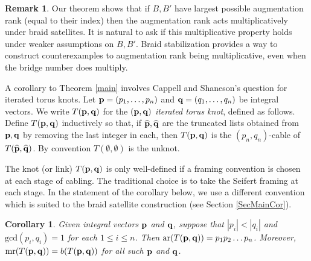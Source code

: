 \documentclass{amsart}[11pt,fullpage]
\def\s{{\sigma}}
\def\ar{\operatorname{ar}}
\def\mr{\operatorname{mr}}
\newcommand\Sp{\Sigma^{(p)}}
\newtheorem{cor}[thm]{Corollary}
\theoremstyle{definition}
\newtheorem{rem}[thm]{Remark}
\begin{document}
\begin{rem}Our theorem shows that if $B, B'$ have largest possible augmentation rank (equal to their index) then the augmentation rank acts multiplicatively under braid satellites. It is natural to ask if this multiplicative property holds under weaker assumptions on $B, B'$. Braid stabilization provides a way to construct counterexamples to augmentation rank being multiplicative, even when the bridge number does multiply.
\label{rem:BrSatNotMult}
\end{rem}

A corollary to Theorem \ref{main} involves Cappell and Shaneson's question for iterated torus knots. Let ${\bf p}=(p_1,\ldots,p_n)$ and ${\bf q}=(q_1,\ldots,q_n)$ be integral vectors. We write $T({\bf p},{\bf q})$ for the $({\bf p},{\bf q})$ \emph{iterated torus knot}, defined as follows. Define $T({\bf p},{\bf q})$ inductively so that, if $\widehat{\bf p}, \widehat{\bf q}$ are the truncated lists obtained from ${\bf p},{\bf q}$ by removing the last integer in each, then $T({\bf p},{\bf q})$ is the $(p_n,q_n)$-cable of $T(\widehat{\bf p},\widehat{\bf q})$. By convention $T(\emptyset,\emptyset)$ is the unknot.

The knot (or link) $T({\bf p},{\bf q})$ is only well-defined if a framing convention is chosen at each stage of cabling. The traditional choice is to take the Seifert framing at each stage. In the statement of the corollary below, we use a different convention which is suited to the braid satellite construction (see Section \ref{SecMainCor}).

\begin{cor}\label{cor:iteratedCables}
Given integral vectors ${\bf p}$ and ${\bf q}$, suppose that $|p_i|<|q_i|$ and $\text{gcd}(p_i,q_i)=1$ for each $1\le i\le n$. Then $\ar(T({\bf p},{\bf q}))=p_1p_2\ldots p_n$. Moreover, $\mr(T({\bf p},{\bf q})) = b(T({\bf p},{\bf q}))$ for all such ${\bf p}$ and ${\bf q}$.
\end{cor}


\end{document}
